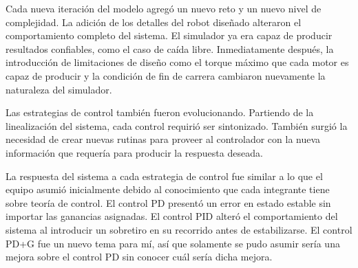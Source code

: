 Cada nueva iteración del modelo agregó un nuevo reto y un nuevo nivel de complejidad. 
La adición de los detalles del robot diseñado alteraron el comportamiento completo del sistema. 
El simulador ya era capaz de producir resultados confiables, como el caso de caída libre.
Inmediatamente después, la introducción de limitaciones de diseño como el torque máximo que cada motor es capaz de producir y la condición de fin de carrera
cambiaron nuevamente la naturaleza del simulador.

Las estrategias de control también fueron evolucionando. 
Partiendo de la linealización del sistema, cada control requirió ser sintonizado.
También surgió la necesidad de crear nuevas rutinas para proveer al controlador con la nueva información que requería para producir la respuesta deseada.

La respuesta del sistema a cada estrategia de control fue similar a lo que el equipo asumió inicialmente debido al conocimiento que cada integrante tiene sobre teoría de control.
El control PD presentó un error en estado estable sin importar las ganancias asignadas.
El control PID alteró el comportamiento del sistema al introducir un sobretiro en su recorrido antes de estabilizarse.
El control PD+G fue un nuevo tema para mí, así que solamente se pudo asumir sería una mejora sobre el control PD sin conocer cuál sería dicha mejora.

